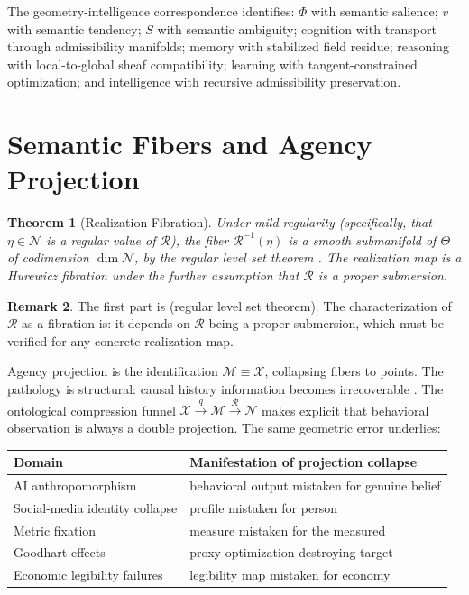 \documentclass[12pt, a4paper]{article}
\theoremstyle{rsvpstyle}
\newtheorem{theorem}{Theorem}[section]
\theoremstyle{definition}
\newtheorem{remark}[theorem]{Remark}
\newcommand{\Traj}{\mathcal{X}}
\newcommand{\OpMan}{\mathcal{M}}
\newcommand{\Real}{\mathcal{R}}
\begin{document}
The geometry-intelligence correspondence identifies: $\Phi$ with semantic
salience; $v$ with semantic tendency; $S$ with semantic ambiguity; cognition
with transport through admissibility manifolds; memory with stabilized field
residue; reasoning with local-to-global sheaf compatibility; learning with
tangent-constrained optimization; and intelligence with recursive admissibility
preservation.

\section{Semantic Fibers and Agency Projection}

\begin{theorem}[Realization Fibration]
\label{thm:fibration}
Under mild regularity (specifically, that $\eta \in \mathcal{N}$ is a regular
value of $\Real$), the fiber $\Real^{-1}(\eta)$ is a smooth submanifold of
$\Theta$ of codimension $\dim\mathcal{N}$, by the regular level set theorem
\citep{Lee2013,Hatcher2002}. The realization map is a Hurewicz fibration
under the further assumption that $\Real$ is a proper submersion.
\end{theorem}

\begin{remark}
The first part is (regular level set theorem). The characterization of
$\Real$ as a fibration is: it depends on $\Real$ being a proper
submersion, which must be verified for any concrete realization map.
\end{remark}

Agency projection is the identification $\OpMan \equiv \Traj$, collapsing
fibers to points. The pathology is structural: causal history information
becomes irrecoverable \citep{Pearl2009}. The ontological compression funnel
$\Traj \xrightarrow{q} \OpMan \xrightarrow{\Real} \mathcal{N}$ makes explicit
that behavioral observation is always a double projection. The same
geometric error underlies:

\begin{center}
\begin{tabular}{ll}
\toprule
\textbf{Domain} & \textbf{Manifestation of projection collapse} \\
\midrule
AI anthropomorphism & behavioral output mistaken for genuine belief \\
Social-media identity collapse & profile mistaken for person \\
Metric fixation & measure mistaken for the measured \\
Goodhart effects & proxy optimization destroying target \\
Economic legibility failures & legibility map mistaken for economy \\
\bottomrule
\end{tabular}
\end{center}
\end{document}
